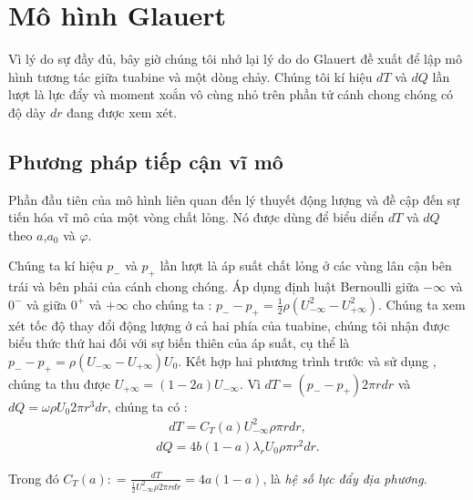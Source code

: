 \documentclass[a4paper,twoside,13pt]{extbook}
\begin{document}
\section{Mô hình Glauert}
Vì lý do sự đầy đủ, bây giờ chúng tôi nhớ lại lý do do Glauert đề xuất để lập mô hình tương tác giữa tuabine và một dòng chảy. Chúng tôi kí hiệu $dT$ và $dQ$ lần lượt là lực đẩy và moment xoắn vô cùng nhỏ trên phần tử cánh chong chóng có độ dày $dr$ đang được xem xét.
\subsection{Phương pháp tiếp cận vĩ mô}
Phần đầu tiên của mô hình liên quan đến lý thuyết động lượng và đề cập đến sự tiến hóa vĩ mô của một vòng chất lỏng. Nó được dùng để biểu diển $dT$ và $dQ$ theo $a$,$a_0$ và $\varphi$.

Chúng ta kí hiệu $p_-$ và $p_+$ lần lượt là áp suất chất lỏng ở các vùng lân cận bên trái và bên phải của cánh chong chóng. Áp dụng định luật Bernoulli giữa $-\infty$ và $0^-$ và giữa $0^+$ và $+\infty$ cho chúng ta : ${p_ - } - {p_ + } = \frac{1}{2}\rho \left( {U_{ - \infty }^2 - U_{ + \infty }^2} \right)$. Chúng ta xem xét tốc độ thay đổi động lượng ở cả hai phía của tuabine, chúng tôi nhận được biểu thức thứ hai đối với sự biến thiên của áp suất, cụ thể là ${p_ - } - {p_ + } = \rho \left( {{U_{ - \infty }} - {U_{ + \infty }}} \right){U_0}$. Kết hợp hai phương trình trước và sử dụng , chúng ta thu được ${U_{ + \infty }} = \left( {1 - 2a} \right){U_{ - \infty }}$. Vì $dT = \left( {{p_ - } - {p_ + }} \right)2\pi rdr$ và $dQ = \omega \rho {U_0}2\pi {r^3}dr$, chúng ta có :
\begin{equation}\label{eq:1_7}
    \begin{aligned}
            dT = {C_T}\left( a \right)U_{ - \infty }^2\rho \pi rdr,
    \end{aligned}
\end{equation}
\begin{equation}\label{eq:1_8}
    \begin{aligned}
            dQ = 4b\left( {1 - a} \right){\lambda _r}{U_0}\rho \pi {r^2}dr.
    \end{aligned}
\end{equation}

Trong đó $\displaystyle {C_T}\left( a \right): = \frac{{dT}}{{\frac{1}{2}U_{ - \infty }^2\rho 2\pi rdr}} = 4a\left( {1 - a} \right)$, là \emph{hệ số lực đẩy địa phương}.
\end{document}
